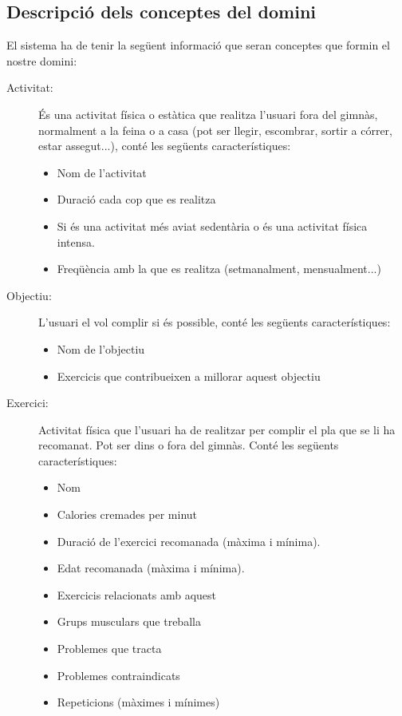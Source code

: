 \documentclass[a4paper, 12pt]{article}
\begin{document}
\subsection{Descripció dels conceptes del domini} 

El sistema ha de tenir la següent informació que seran conceptes que formin el nostre domini:

\begin{description}
	\item[Activitat:] És una activitat física o estàtica que realitza l'usuari fora del gimnàs, normalment a la feina o a casa (pot ser llegir, escombrar, sortir a córrer, estar assegut...), conté les següents característiques:
	
	\begin{itemize}
		\item Nom de l'activitat
		\item Duració cada cop que es realitza
		\item Si és una activitat més aviat sedentària o és una activitat física intensa.  
		\item Freqüència amb la que es realitza (setmanalment, mensualment...)
	\end{itemize}
	
	\item[Objectiu:] L'usuari el vol complir si és possible, conté les següents característiques:
	\begin{itemize}
		\item Nom de l'objectiu
		\item Exercicis que contribueixen a millorar aquest objectiu
	\end{itemize}
	
	\item[Exercici:] Activitat física que l'usuari ha de realitzar per complir el pla que se li ha recomanat. Pot ser dins o fora del gimnàs. Conté les següents característiques:
	\begin{itemize}
		\item Nom
		\item Calories cremades per minut
		\item Duració de l'exercici recomanada (màxima i mínima).
		\item Edat recomanada (màxima i mínima).
		\item Exercicis relacionats amb aquest
		\item Grups musculars que treballa
		\item Problemes que tracta
		\item Problemes contraindicats
		\item Repeticions (màximes i mínimes)
	\end{itemize}
\end{description}
\end{document}
